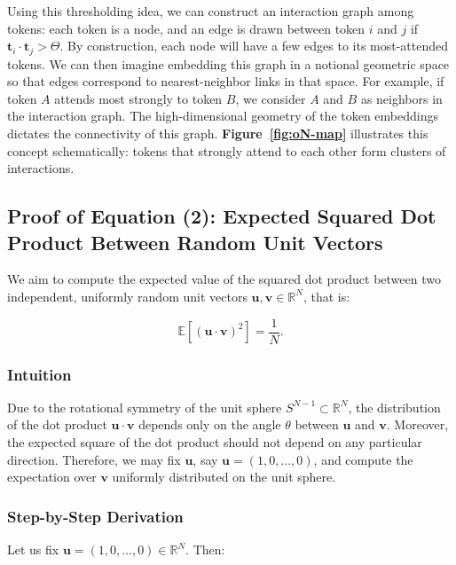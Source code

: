\documentclass[12pt]{article}
\begin{document}
Using this thresholding idea, we can construct an interaction graph among tokens: each token is a node, and an edge is drawn between token $i$ and $j$ if $\mathbf{t}_i \cdot \mathbf{t}_j > \Theta$. By construction, each node will have a few edges to its most-attended tokens. We can then imagine embedding this graph in a notional geometric space so that edges correspond to nearest-neighbor links in that space. For example, if token $A$ attends most strongly to token $B$, we consider $A$ and $B$ as neighbors in the interaction graph. The high-dimensional geometry of the token embeddings dictates the connectivity of this graph. \textbf{Figure~\ref{fig:oN-map}} illustrates this concept schematically: tokens that strongly attend to each other form clusters of interactions.

\subsection*{Proof of Equation (2): Expected Squared Dot Product Between Random Unit Vectors}

We aim to compute the expected value of the squared dot product between two independent, uniformly random unit vectors \( \mathbf{u}, \mathbf{v} \in \mathbb{R}^N \), that is:

\begin{equation}
\mathbb{E}\left[ (\mathbf{u} \cdot \mathbf{v})^2 \right] = \frac{1}{N}.
\end{equation}

\subsubsection*{Intuition}
Due to the rotational symmetry of the unit sphere \( S^{N-1} \subset \mathbb{R}^N \), the distribution of the dot product \( \mathbf{u} \cdot \mathbf{v} \) depends only on the angle \( \theta \) between \( \mathbf{u} \) and \( \mathbf{v} \). Moreover, the expected square of the dot product should not depend on any particular direction. Therefore, we may fix \( \mathbf{u} \), say \( \mathbf{u} = (1, 0, \dots, 0) \), and compute the expectation over \( \mathbf{v} \) uniformly distributed on the unit sphere.

\subsubsection*{Step-by-Step Derivation}
Let us fix \( \mathbf{u} = (1, 0, \dots, 0) \in \mathbb{R}^N \). Then:
\end{document}
